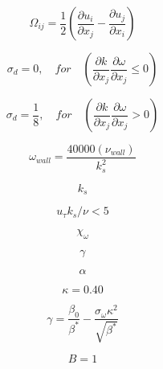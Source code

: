 \begin{equation}
\Omega_{ij} = \frac{1}{2} \left( \frac{\partial u_i}{\partial x_j} - \frac{\partial u_j}{\partial x_i} \right)
\end{equation}

\begin{equation}
\sigma_d = 0, \quad for \quad \left( \frac{\partial k}{\partial x_j} 
   \frac{\partial \omega}{\partial x_j} \leq 0 \right)
\end{equation}

\begin{equation}
\sigma_d = \frac{1}{8}, \quad for \quad \left( \frac{\partial k}{\partial x_j} 
   \frac{\partial \omega}{\partial x_j} > 0 \right)
\end{equation}

\begin{equation}
\omega_{wall} = \frac{40000 (\nu_{wall})}{k_s^2}
\end{equation}

\begin{equation}
k_s
\end{equation}

\begin{equation}
u_{\tau} k_s / \nu < 5
\end{equation}

\begin{equation}
\chi_{\omega}
\end{equation}

\begin{equation}
\gamma
\end{equation}

\begin{equation}
\alpha
\end{equation}

\begin{equation}
\kappa = 0.40
\end{equation}

\begin{equation}
\gamma = \frac{\beta_0}{\beta^*} - \frac{\sigma_{\omega} \kappa^2}{\sqrt{\beta^*}}
\end{equation}

\begin{equation}
B=1
\end{equation}


